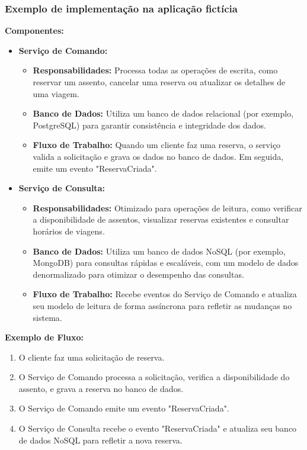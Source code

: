 \subsubsection{Exemplo de implementação na aplicação fictícia}

\textbf{Componentes:}

\begin{itemize}
    \item \textbf{Serviço de Comando:}
    \begin{itemize}
        \item \textbf{Responsabilidades:} Processa todas as operações de escrita, como reservar um assento, cancelar uma reserva ou atualizar os detalhes de uma viagem.
        \item \textbf{Banco de Dados:} Utiliza um banco de dados relacional (por exemplo, PostgreSQL) para garantir consistência e integridade dos dados.
        \item \textbf{Fluxo de Trabalho:} Quando um cliente faz uma reserva, o serviço valida a solicitação e grava os dados no banco de dados. Em seguida, emite um evento "ReservaCriada".
    \end{itemize}

    \item \textbf{Serviço de Consulta:}
    \begin{itemize}
        \item \textbf{Responsabilidades:} Otimizado para operações de leitura, como verificar a disponibilidade de assentos, visualizar reservas existentes e consultar horários de viagens.
        \item \textbf{Banco de Dados:} Utiliza um banco de dados NoSQL (por exemplo, MongoDB) para consultas rápidas e escaláveis, com um modelo de dados denormalizado para otimizar o desempenho das consultas.
        \item \textbf{Fluxo de Trabalho:} Recebe eventos do Serviço de Comando e atualiza seu modelo de leitura de forma assíncrona para refletir as mudanças no sistema.
    \end{itemize}
\end{itemize}

\textbf{Exemplo de Fluxo:}

\begin{enumerate}
    \item O cliente faz uma solicitação de reserva.
    \item O Serviço de Comando processa a solicitação, verifica a disponibilidade do assento, e grava a reserva no banco de dados.
    \item O Serviço de Comando emite um evento "ReservaCriada".
    \item O Serviço de Consulta recebe o evento "ReservaCriada" e atualiza seu banco de dados NoSQL para refletir a nova reserva.
\end{enumerate}

